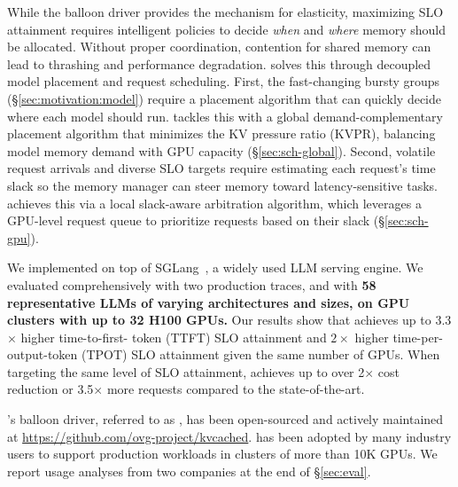  While the balloon driver provides the mechanism for elasticity, maximizing SLO attainment requires intelligent policies to decide \emph{when} and \emph{where} memory should be allocated. Without proper coordination, contention for shared memory can lead to thrashing and performance degradation.
\tool solves this through decoupled model placement and request scheduling. First, the fast-changing bursty groups (\S\ref{sec:motivation:model}) require a placement algorithm that can quickly decide where each model should run. \tool tackles this with a global demand-complementary placement algorithm that minimizes the KV pressure ratio (KVPR), balancing model memory demand with GPU capacity (\S\ref{sec:sch-global}).
Second, volatile request arrivals and diverse SLO targets require estimating each request’s time slack so the memory manager can steer memory toward latency-sensitive tasks. \tool achieves this via a local slack-aware arbitration algorithm, which leverages a GPU-level request queue to prioritize requests based on their slack (\S\ref{sec:sch-gpu}).

We implemented \tool on top of SGLang~\cite{sglang@arxiv23}, a widely used LLM serving engine. We evaluated \tool comprehensively with two production traces, and with \textbf{58 representative LLMs of varying architectures and sizes, on GPU clusters with up to 32 H100 GPUs. }
Our results show that \tool achieves up to 3.3$\times$ higher time-to-first-
token (TTFT) SLO attainment and $2\times$ higher time-per-output-token (TPOT) SLO attainment given the same number of GPUs.
When targeting the same level of SLO attainment, \tool achieves up to over 2$\times$ cost reduction or 3.5$\times$ more requests compared to the state-of-the-art. 

\tool's balloon driver, referred to as , has been open-sourced and actively maintained at \url{https://github.com/ovg-project/kvcached}.  has been adopted by many industry users to support production workloads in clusters of more than 10K GPUs.
We report usage analyses from two companies at the end of \S\ref{sec:eval}. 
